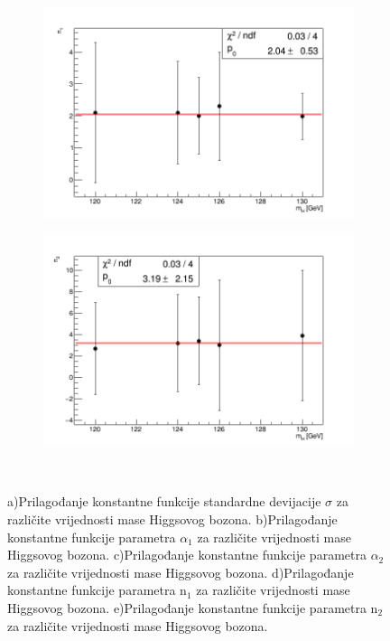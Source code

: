 \documentclass[12pt,a4paper,oneside]{article}
\begin{document}
\begin{linenumbers}
\begin{figure}[H]
			\begin{subfigure}[b]{0.49\textwidth}
				\includegraphics[width=\textwidth]{fitanje-n1-4-8.png}
				\caption{}
				\label{fig:n}
			\end{subfigure}
			\begin{subfigure}[b]{0.49\textwidth}
				\includegraphics[width=\textwidth]{fitanje-n2-4-8.png}
				\caption{}
				\label{fig:n2}
			\end{subfigure}
			~ %
			\caption{ a)Prilagođanje konstantne funkcije standardne devijacije $\sigma$ za različite vrijednosti mase Higgsovog bozona.	b)Prilagođanje konstantne funkcije parametra $\alpha_{1}$ za različite vrijednosti mase Higgsovog bozona.		c)Prilagođanje konstantne funkcije parametra $\alpha_{2}$ za različite vrijednosti mase Higgsovog bozona.		d)Prilagođanje konstantne funkcije parametra n$_{\mathrm{1}}$ za različite vrijednosti mase Higgsovog bozona.		e)Prilagođanje konstantne funkcije parametra n$_{\mathrm{2}}$ za različite vrijednosti mase Higgsovog bozona.}\label{fig:grafovi-1}
		\end{figure}
		

\end{linenumbers}
\end{document}

